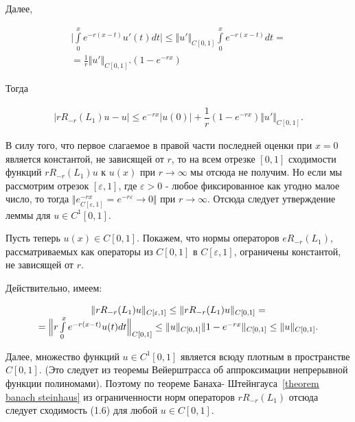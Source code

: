 Далее,

\begin{equation}
\begin{array}{c}
\nonumber

\biggl| \int\limits_0^x e^{-r(x-t)}u'(t)dt \biggr| \leq \Vert u' \Vert_{C[0,1]} \int\limits_0^x e^{-r(x-t)}dt = \\
= \frac{1}{r} \Vert u' \Vert_{C[0,1]}.
(1 - e^{-rx}) 
\end{array}
\end{equation}

Тогда

\begin{equation}
\begin{array}{c}

\bigl| rR_{-r}(L_1)u - u \bigr| \leq e^{-rx} \bigl| u(0) \bigr| + \dfrac{1}{r} (1-e^{-rx})\Vert u' \Vert_{C[0,1]}.

\end{array}
\end{equation}

В силу того, что первое слагаемое в правой части последней оценки при $ x = 0 $ является константой, не зависящей от $ r $, то на всем отрезке $ [0,1] $ сходимости функций $ rR_{-r}(L_1)u $ к $ u(x) $ при $ r \rightarrow \infty $ мы отсюда не получим. Но если мы рассмотрим отрезок $ [\varepsilon, 1] $, где $ \varepsilon > 0 $ - любое фиксированное как угодно малое число, то тогда $ \Vert e^{-rx}_{C[\varepsilon,1]} = e^{-r\varepsilon} \rightarrow 0 \Vert $ при $ r \rightarrow \infty $. Отсюда следует утверждение леммы для $ u \in C^1[0,1] $.

Пусть теперь $ u(x) \in C[0,1] $. Покажем, что нормы операторов $ eR_{-r}(L_1) $, рассматриваемых как операторы из $  C[0,1] $ в $ C[\varepsilon,1] $, ограничены константой, не зависящей от $ r $.

Действительно, имеем:

\begin{equation}
\begin{array}{c}

\Vert rR_{-r}(L_1)u \Vert_{C[\varepsilon,1]} \leq \Vert rR_{-r}(L_1)u \Vert_{C[0,1]} = \\
= \Bigl\Vert r\int\limits_0^x e^{-r(x-t)}u(t)dt\Bigr\Vert_{C[0,1]} \leq \Vert u\Vert_{C[0,1]}\Vert 1 - e^{-rx}\Vert_{C[0,1]} \leq \Vert u \Vert_{C[0,1]}.

\end{array}
\end{equation}

Далее, множество функций $ u \in C^1[0,1] $ является всюду плотным в пространстве $ C[0,1] $. (Это следует из теоремы Вейерштрасса об аппроксимации непрерывной функции полиномами). Поэтому по теореме Банаха- Штейнгауса~\eqref{theorem banach steinhaus} из ограниченности норм операторов $ rR_{-r}(L_1) $ отсюда следует сходимость (1.6) для любой $ u \in C[0,1] $.

